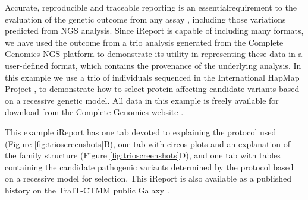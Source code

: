 Accurate, reproducible and traceable reporting is an essentialrequirement to the evaluation of the genetic outcome from any assay \cite{skyline}, including those variations predicted from NGS analysis. Since iReport is capable of including many formats, we have used the outcome from a trio analysis generated from the Complete Genomics \cite{drmanac} NGS platform to demonstrate its utility in representing these data in a user-defined format, which contains the provenance of the underlying analysis. In this example we use a trio of individuals sequenced in the International HapMap Project \cite{hapmap}\cite{hapmap2}, to demonstrate how to select protein affecting candidate variants based on a recessive genetic model.  All data in this example is freely available for download from the Complete Genomics website \cite{url-CGpublicdata}.

This example iReport has one tab devoted to explaining the protocol used (Figure \ref{fig:trioscreenshots}B), one tab with circos plots and an explanation of the family structure (Figure \ref{fig:trioscreenshots}D), and one tab with tables containing the candidate pathogenic variants determined by the protocol based on a recessive model for selection. This iReport is also available as a published history on the TraIT-CTMM public Galaxy \cite{url-traitgalaxy}.

